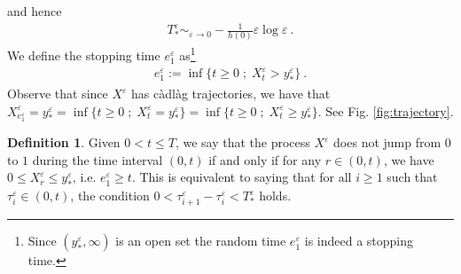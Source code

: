 \documentclass[reqno, 12pt, a4paper]{amsart}
\theoremstyle{plain}
\theoremstyle{definition}
\newtheorem{definition}[theorem]{Definition}
\begin{document}
and hence
\begin{equation}
\label{eq:asymptoticsT_*}
\begin{split}
T^\varepsilon_*\sim_{\varepsilon \to 0}  -\frac{1}{h(0)} \varepsilon  \log \varepsilon \ .
\end{split}
\end{equation}
We define the stopping time $e_1^\varepsilon$ as{\footnote{Since $(y_*^\varepsilon, \infty)$ is an open set the random time $e_1^\varepsilon$ is indeed a stopping time.}}
\begin{equation}
\begin{split}
e_1^\varepsilon:= \inf\{t \ge 0\; ; \; X_t^\varepsilon > y_*^ \varepsilon\} \ .
\end{split}
\end{equation}
Observe that since $X^\varepsilon$ has c\`adl\`ag trajectories, we have that $X^{\varepsilon}_{e_1^\varepsilon} = y_*^\varepsilon = \inf\{t \ge 0\; ; \; X_t^\varepsilon = y_*^ \varepsilon\} = \inf\{t \ge 0\; ; \; X_t^\varepsilon \ge y_*^ \varepsilon\}$. See Fig. \ref{fig:trajectory}.






\begin{definition}
Given $0< t \le T$, we say that the process $X^\varepsilon$ does not jump from $0$ to $1$ during the time interval $(0,t)$ if and only if for any $r \in (0,t)$, we have $0 \le X_r^\varepsilon \le y_*^\varepsilon$, i.e. $e_1^\varepsilon \ge t$. This is equivalent to saying that for all $i\ge 1$ such that $\tau_i^\varepsilon \in (0,t)$, the condition $0<\tau^{\varepsilon}_{i+1} -\tau_i^\varepsilon<T_*^\varepsilon$ holds. 
\end{definition}



\bigskip
\end{document}
